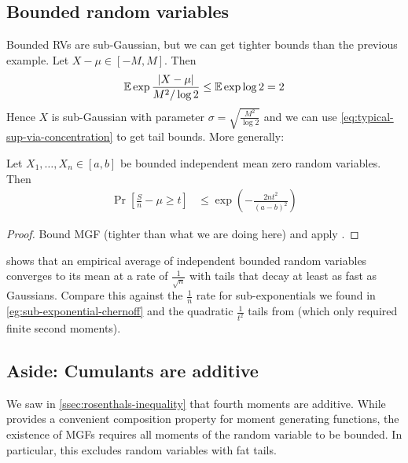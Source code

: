 \subsection{Bounded random variables}

Bounded RVs are sub-Gaussian, but we can get tighter bounds than the previous example.
Let $X - \mu \in [-M, M]$. Then
\begin{align}
    \mathbb{E} \exp \frac{\lvert X - \mu \rvert}{M^2 / \log 2} \leq \mathbb{E} \exp \log 2 = 2
\end{align}
Hence $X$ is sub-Gaussian with parameter $\sigma = \sqrt{\frac{M^2}{\log 2}}$
and we can use \cref{eq:typical-sup-via-concentration} to get tail bounds.
More generally:
\begin{corollary}\label{corr:hoeffding-inequality}
    Let $X_1,\ldots, X_n \in [a,b]$ be bounded independent mean zero random variables. Then
    \begin{align}
        \Pr\left[\frac{S}{n} - \mu \geq t \right] &\leq \exp\left( - \frac{2 n t^2}{(a - b)^2} \right)
    \end{align}
\end{corollary}

\begin{proof}
    Bound MGF (tighter than what we are doing here) and apply .
\end{proof}

 shows that an empirical average of independent bounded random variables
converges to its mean at a rate of $\frac{1}{\sqrt{n}}$ with tails that decay at least as fast as Gaussians.
Compare this against the $\frac{1}{n}$ rate for sub-exponentials we found in \cref{eg:sub-exponential-chernoff}
and the quadratic $\frac{1}{t^2}$ tails from  (which only required finite second moments).

\subsection{Aside: Cumulants are additive}\label{ssec:cumulants-additive}

We saw in \cref{ssec:rosenthals-inequality} that fourth moments are additive.
While  provides a convenient composition property for moment generating functions,
the existence of MGFs requires all moments of the random variable to be bounded. In particular, this excludes
random variables with fat tails.


